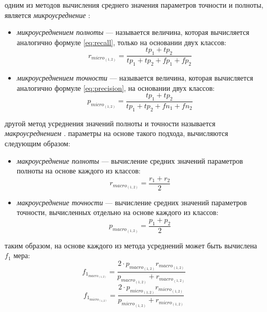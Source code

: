     одним из методов вычисления среднего значения параметров точности и полноты,
    является {\it микроусреднение} \cite{micromacromeasures}:
    \begin{itemize}
        \item {\it микроусреднением полноты} --- называется величина, которая
            вычисляется аналогично формуле \ref{eq:recall}, только на основании
            двух классов:
            \begin{equation}
                r_{micro_{(1, 2)}} = \dfrac{tp_{1} + tp_{2}}{tp_{1} + tp_{2} + fp_{1} + fp_{2}} \nonumber
            \end{equation}
        \item {\it микроусреднением точности} --- называется величина,
            которая вычисляется аналогично формуле \ref{eq:precision},
            на основании двух классов:
            \begin{equation}
                p_{micro_{(1, 2)}} = \dfrac{tp_{1} + tp_{2}}{tp_{1} + tp_{2} + fn_{1} + fn_{2}} \nonumber
            \end{equation}
    \end{itemize}


    другой метод усреднения значений полноты и точности называется {\it макроусреднением} \cite{micromacromeasures}.
    параметры на основе такого подхода, вычисляются следующим образом:
    \begin{itemize}
        \item {\it макроусреднение полноты} --- вычисление средних значений параметров
            полноты на основе каждого из классов:
            \begin{equation}
                r_{macro_{(1, 2)}} = \dfrac{r_{1} + r_{2}}{2} \nonumber
            \end{equation}
        \item {\it макроусреднение точности} --- вычисление средних значений параметров
            точности, вычисленных отдельно на основе каждого из классов:
            \begin{equation}
                p_{macro_{(1, 2)}} = \dfrac{p_{1} + p_{2}}{2} \nonumber
            \end{equation}
    \end{itemize}

    таким образом, на основе каждого из метода усреднений может быть вычислена
    $f_1$ мера:
    \begin{equation}
        \label{eq:fmacro12}
        f_{1_{macro_{(1,2)}}} = \dfrac{2 \cdot p_{macro_{(1,2)}} r_{macro_{(1,2)}} }{p_{macro_{(1,2)}} + r_{macro_{(1,2)}}}
    \end{equation}
    \begin{equation}
        \label{eq:fmicro12}
        f_{1_{micro_{(1,2)}}} = \dfrac{2 \cdot p_{micro_{(1,2)}} r_{micro_{(1,2)}} }{p_{micro_{(1,2)}} + r_{micro_{(1,2)}}}
    \end{equation}

